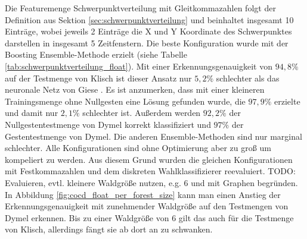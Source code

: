 Die Featuremenge Schwerpunktverteilung mit Gleitkommazahlen folgt der Definition aus Sektion \ref{sec:schwerpunktverteilung} und beinhaltet insgesamt 10 Einträge, wobei jeweils 2 Einträge die X und Y
Koordinate des Schwerpunktes darstellen in insgesamt 5 Zeitfenstern.
\newline
\newline
Die beste Konfiguration wurde mit der Boosting Ensemble-Methode erzielt (siehe Tabelle \ref{tab:schwerpunktverteilung_float}). Mit einer Erkennungsgenauigkeit von $94,8\%$ auf der Testmenge von Klisch
ist dieser Ansatz nur $5,2\%$ schlechter als das neuronale Netz von Giese \cite{gieseThesis}. Es ist anzumerken, dass mit einer kleineren Trainingsmenge ohne Nullgesten eine Lösung gefunden wurde, die
$97,9\%$ erzielte und damit nur $2,1\%$ schlechter ist. Außerdem werden $92,2\%$ der Nullgestentestmenge von Dymel korrekt klassifiziert und $97\%$ der Gestentestmenge von Dymel. Die anderen
Ensemble-Methoden sind nur marginal schlechter.
\newline
\newline
Alle Konfigurationen sind ohne Optimierung aber zu groß um kompeliert zu werden. Aus diesem Grund wurden die gleichen Konfigurationen mit Festkommazahlen und dem diskreten Wahlklassifizierer reevaluiert.
TODO: Evaluieren, evtl. kleinere Waldgröße nutzen, e.g. 6 und mit Graphen begründen.
\newline
\newline
In Abbildung \ref{fig:cocd_float_per_forest_size} kann man einen Anstieg der Erkennungsgenauigkeit mit zunehmender Waldgröße auf den Testmengen von Dymel erkennen. Bis zu einer Waldgröße von 6 gilt das
auch für die Testmenge von Klisch, allerdings fängt sie ab dort an zu schwanken.

